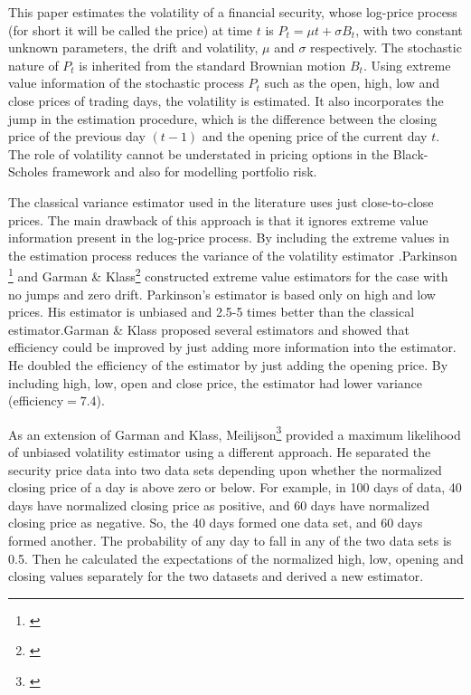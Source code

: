 \documentclass[12pt]{article}   	%
\begin{document}
This paper estimates the volatility of a financial security, whose log-price process (for short it will be called the price) 
at time $t$ is $ P_{t}  = \mu t + \sigma B_{t} $, with two constant unknown parameters, the drift and volatility, $\mu$ and $\sigma$ respectively. 
The stochastic nature of $P_t$ is inherited from the standard Brownian motion $B_t$.   Using extreme value information of the stochastic process $P_t$ such as the open, high, low and close prices of trading days, the volatility is estimated.  It also incorporates the jump in the estimation procedure, which is the difference between the closing price of the previous day $(t-1)$ and the opening price of the current day $t$. The role of volatility cannot be understated in pricing options in the Black-Scholes framework and also for modelling portfolio risk.
\par	The classical variance estimator used in the literature uses just close-to-close prices. The main drawback of this approach is that it ignores extreme value information present in the log-price process. By including the extreme values in the estimation process reduces the variance of the volatility estimator .Parkinson \footnote{\citealp{parkinson1980}} and Garman \& Klass\footnote{\citealp{garman1980}} constructed extreme value estimators for the case with no jumps and zero drift. Parkinson's estimator is based only on high and low prices. His estimator is unbiased and 2.5-5 times better than the classical estimator.Garman \& Klass proposed several estimators and showed that efficiency could be improved by just adding more information into the estimator. He doubled the efficiency of the estimator by just adding the opening price. By including high, low, open and close price, the estimator had lower variance (efficiency$ = 7.4$). 
\par As an extension of Garman and Klass, Meilijson\footnote{\citealp{meilijson2008}} provided a maximum likelihood of unbiased volatility estimator using a different approach. 
He separated the security price data into two data sets depending upon whether the normalized closing price of a day is above zero or below. 
For example, in 100 days of data, 40 days have normalized closing price as positive, and 60 days have normalized closing price as negative. 
So, the 40 days formed one data set, and 60 days formed another. The probability of any day to fall in any of the two data sets is 0.5. 
Then he calculated the expectations of the normalized high, low, opening and closing values separately for the two datasets and derived a new estimator. 
\end{document}
